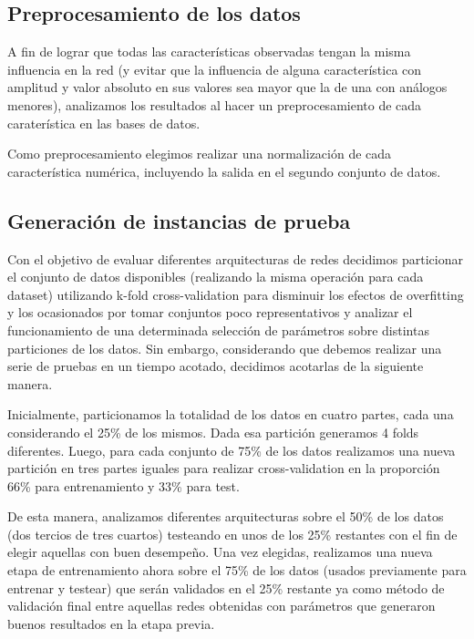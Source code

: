 \documentclass[informe.tex]{subfiles}
\begin{document}
    \vspace{15pt}

  \subsection{Preprocesamiento de los datos}
  
    A fin de lograr que todas las características observadas tengan la misma influencia en la red (y evitar que la influencia de alguna característica con amplitud y valor absoluto en sus valores sea mayor que la de una con análogos menores), analizamos los resultados al hacer un preprocesamiento de cada caraterística en las bases de datos.
    
    Como preprocesamiento elegimos realizar una normalización de cada característica numérica, incluyendo la salida en el segundo conjunto de datos.
  
  
  \subsection{Generación de instancias de prueba}

    Con el objetivo de evaluar diferentes arquitecturas de redes decidimos particionar el conjunto de datos disponibles (realizando la misma operación para cada dataset) utilizando k-fold cross-validation para disminuir los efectos de overfitting y los ocasionados por tomar conjuntos poco representativos y analizar el funcionamiento de una determinada selección de parámetros sobre distintas particiones de los datos. Sin embargo, considerando que debemos realizar una serie de pruebas en un tiempo acotado, decidimos acotarlas de la siguiente manera.
    
    Inicialmente, particionamos la totalidad de los datos en cuatro partes, cada una considerando el 25\% de los mismos. Dada esa partición generamos 4 folds diferentes. Luego, para cada conjunto de 75\% de los datos realizamos una nueva partici\'on en tres partes iguales para realizar cross-validation en la proporci\'on 66\% para entrenamiento y 33\% para test. 
    
    De esta manera, analizamos diferentes arquitecturas sobre el 50\% de los datos (dos tercios de tres cuartos) testeando en unos de los 25\% restantes con el fin de elegir aquellas con buen desempeño. Una vez elegidas, realizamos una nueva etapa de entrenamiento ahora sobre el 75\% de los datos (usados previamente para entrenar y testear) que ser\'an validados en el 25\% restante ya como m\'etodo de validaci\'on final entre aquellas redes obtenidas con parámetros que generaron buenos resultados en la etapa previa.
  
\end{document}
